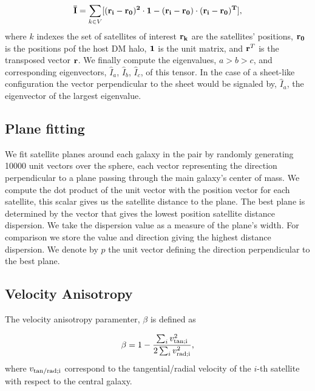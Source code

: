 \documentclass[a4paper,fleqn,usenatbib]{mnras}
\begin{document}
\begin{equation}
{\bf{\bar{I}}} = \sum_{k \in V}[(\bf{r}_i - \bf{r}_0)^2\cdot \bf{1} -
  (\bf{r}_i-\bf{r}_0)\cdot (\bf{r}_i - \bf{r}_0)^{T}],
\end{equation}
%
where $k$ indexes the set of satellites of interest
$\bf{r}_k$ are the satellites' positions, $\bf{r}_{0}$ is the
positions pof the host DM halo, $\bf{1}$ is the unit matrix,  and
${\bf r}^T$ is the transposed vector $\bf{r}$. 
We finally compute the eigenvalues, $a>b>c$, and corresponding
eigenvectors, $\hat{I}_a$, $\hat{I}_b$, $\hat{I}_c$, of this tensor.
In the case of a sheet-like configuration the vector perpendicular to
the sheet would be signaled by, $\hat{I}_a$, the eigenvector of the
largest eigenvalue. 


\subsection{Plane fitting}
\label{sub:planes}

We fit satellite planes around each galaxy in the pair by randomly
generating 10000 unit vectors over the  sphere, each vector
representing the direction perpendicular to a plane passing through
the main galaxy's center of mass. 
We compute the dot product of the unit vector with the position vector
for each satellite, this scalar gives us the satellite distance to the
plane. 
The best plane is determined by the vector that gives the lowest
position satellite distance dispersion. 
We take the dispersion value as a measure of the plane's width.
For comparison we store the value and direction giving the
highest distance dispersion.
We denote by $\hat{p}$ the unit vector defining the direction
perpendicular to the best plane.


\subsection{Velocity Anisotropy}
\label{sub:beta}

The velocity anisotropy paramenter, $\beta$ is defined as

\begin{equation}
  \beta = 1 - \frac{\sum_i v^2_{\rm{tan}; i}}{2\sum_i v^{2}_{\rm{rad};i}},
\label{eq:beta}
\end{equation}
% 
where $v_{\rm{tan/rad};i}$ correspond to the tangential/radial
velocity of the $i$-th satellite with respect to the central galaxy.
\end{document}
